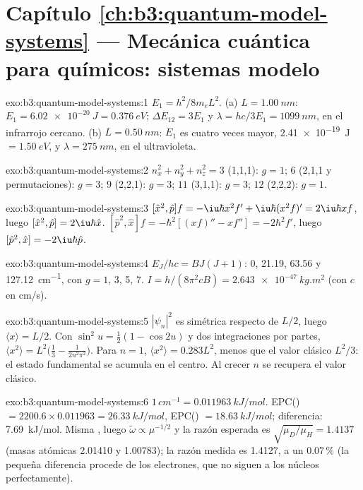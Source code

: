 \section*{Capítulo \ref{ch:b3:quantum-model-systems} --- Mecánica cuántica para químicos: sistemas modelo}

\begin{solution}{exo:b3:quantum-model-systems:1}
$E_1 = h^2/8m_eL^2$. (a) $L = \qty{1.00}{nm}$: $E_1 = \qty{6.02e-20}{J} =
\qty{0.376}{eV}$; $\Delta E_{12} = 3E_1$ y $\lambda = hc/3E_1 =
\qty{1099}{nm}$, en el infrarrojo cercano. (b) $L = \qty{0.50}{nm}$: $E_1$ es cuatro
veces mayor, \qty{2.41e-19}{J} $= \qty{1.50}{eV}$, y $\lambda =
\qty{275}{nm}$, en el ultravioleta.
\end{solution}

\begin{solution}{exo:b3:quantum-model-systems:2}
$n_x^2 + n_y^2 + n_z^2 = 3$ (1,1,1): $g = 1$; $6$ (2,1,1 y permutaciones):
$g = 3$; $9$ (2,2,1): $g = 3$; $11$ (3,1,1): $g = 3$; $12$ (2,2,2): $g = 1$.
\end{solution}

\begin{solution}{exo:b3:quantum-model-systems:3}
$[\hat x^2,\hat p]f = -\iu\hbar x^2f' + \iu\hbar(x^2f)' = 2\iu\hbar xf$, luego
$[\hat x^2,\hat p] = 2\iu\hbar\hat x$. $[\hat p^2,\hat x]f = -\hbar^2[(xf)'' -
xf''] = -2\hbar^2f'$, luego $[\hat p^2,\hat x] = -2\iu\hbar\hat p$.
\end{solution}

\begin{solution}{exo:b3:quantum-model-systems:4}
$E_J/hc = BJ(J+1)$: 0, 21.19, 63.56 y \qty{127.12}{cm^{-1}}, con $g = 1$,
3, 5, 7. $I = h/(8\pi^2cB) = \qty{2.643e-47}{kg.m^2}$ (con $c$ en
\unit{cm/s}).
\end{solution}

\begin{solution}{exo:b3:quantum-model-systems:5}
$|\psi_n|^2$ es simétrica respecto de $L/2$, luego $\langle x\rangle = L/2$. Con
$\sin^2u = \frac12(1 - \cos2u)$ y dos integraciones por partes,
$\langle x^2\rangle = L^2\big(\frac13 - \frac{1}{2n^2\pi^2}\big)$. Para $n = 1$,
$\langle x^2\rangle = 0.283L^2$, menos que el valor clásico $L^2/3$: el estado
fundamental se acumula en el centro. Al crecer $n$ se recupera el valor clásico.
\end{solution}

\begin{solution}{exo:b3:quantum-model-systems:6}
$1\,\unit{cm^{-1}} = \qty{0.011963}{kJ/mol}$. EPC() $= 2200.6 \times
0.011963 = \qty{26.33}{kJ/mol}$, EPC() $= \qty{18.63}{kJ/mol}$; diferencia:
\qty{7.69}{kJ/mol}. Misma , luego $\tilde\omega \propto \mu^{-1/2}$
y la razón esperada es $\sqrt{\mu_D/\mu_H} = 1.4137$ (masas atómicas
2.01410 y 1.00783); la razón medida es 1.4127, a un 0.07\,\% (la
pequeña diferencia procede de los electrones, que no siguen a los núcleos
perfectamente).
\end{solution}

